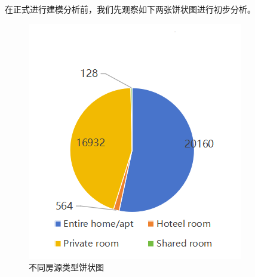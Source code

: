 \documentclass[12pt]{article}
\begin{document}
\begin{CJK}{UTF8}{gbsn}
	在正式进行建模分析前，我们先观察如下两张饼状图进行初步分析。
	
	\begin{figure}[H]
		\centering
		\begin{minipage}[b]{0.45\textwidth}
			\centering
			\includegraphics[width=\linewidth]{pic/11.png}
			\caption{不同房源类型饼状图}
		\end{minipage}
		\hfill
		\begin{minipage}[b]{0.45\textwidth}
			\centering

\end{minipage}
\end{figure}
\end{CJK}
\end{document}
